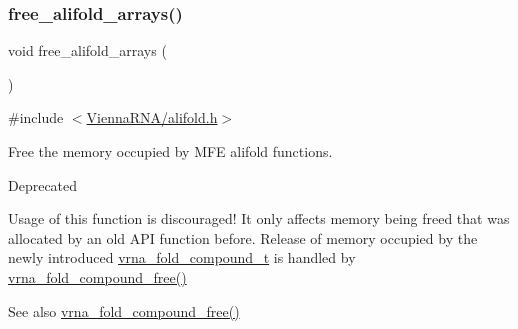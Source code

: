 \subsubsection{\texorpdfstring{free\+\_\+alifold\+\_\+arrays()}{free\_alifold\_arrays()}}
{\footnotesize\ttfamily void free\+\_\+alifold\+\_\+arrays (\begin{DoxyParamCaption}\item[{void}]{ }\end{DoxyParamCaption})}



{\ttfamily \#include $<$\mbox{\hyperlink{alifold_8h}{Vienna\+R\+N\+A/alifold.\+h}}$>$}



Free the memory occupied by M\+FE alifold functions. 

\begin{DoxyRefDesc}{Deprecated}
\item[\mbox{\hyperlink{deprecated__deprecated000014}{Deprecated}}]Usage of this function is discouraged! It only affects memory being free\textquotesingle{}d that was allocated by an old A\+PI function before. Release of memory occupied by the newly introduced \mbox{\hyperlink{group__fold__compound_ga1b0cef17fd40466cef5968eaeeff6166}{vrna\+\_\+fold\+\_\+compound\+\_\+t}} is handled by \mbox{\hyperlink{group__fold__compound_gadded6039d63f5d6509836e20321534ad}{vrna\+\_\+fold\+\_\+compound\+\_\+free()}}\end{DoxyRefDesc}


\begin{DoxySeeAlso}{See also}
\mbox{\hyperlink{group__fold__compound_gadded6039d63f5d6509836e20321534ad}{vrna\+\_\+fold\+\_\+compound\+\_\+free()}} 
\end{DoxySeeAlso}
